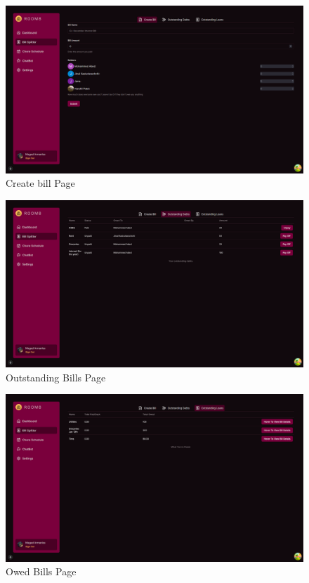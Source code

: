 \documentclass[12pt, titlepage]{article}
\begin{document}
\begin{figure}[H]
  \centering
  \includegraphics[width=\textwidth]{createBill.png}
  \caption{Create bill Page}
  \label{fig:landing}
\end{figure}
\begin{figure}[H]
  \centering
  \includegraphics[width=\textwidth]{outstandingBills.png}
  \caption{Outstanding Bills Page}
  \label{fig:landing}
\end{figure}
\begin{figure}[H]
  \centering
  \includegraphics[width=\textwidth]{owedBills.png}
  \caption{Owed Bills Page}
  \label{fig:landing}
\end{figure}
\end{document}

